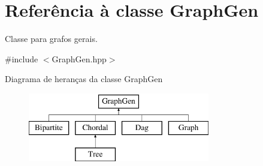 \hypertarget{classGraphGen}{}\section{Referência à classe Graph\+Gen}
\label{classGraphGen}


Classe para grafos gerais.  




{\ttfamily \#include $<$Graph\+Gen.\+hpp$>$}

Diagrama de heranças da classe Graph\+Gen\begin{figure}[H]
\begin{center}
\leavevmode
\includegraphics[height=3.000000cm]{classGraphGen}
\end{center}
\end{figure}
